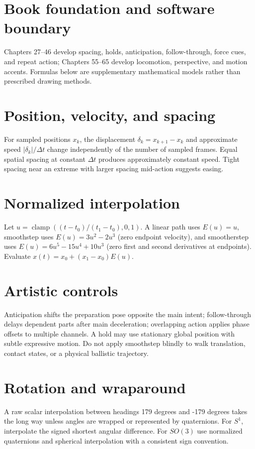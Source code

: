 \documentclass[10pt,letterpaper]{article}
\begin{document}
\makedoctitle
\makedocsummary
\tableofcontents\clearpage

\section{Book foundation and software boundary}
Chapters 27--46 develop spacing, holds, anticipation, follow-through, force cues, and repeat action; Chapters 55--65 develop locomotion, perspective, and motion accents. Formulas below are supplementary mathematical models rather than prescribed drawing methods.
\section{Position, velocity, and spacing}
For sampled positions $x_k$, the displacement $\delta_k=x_{k+1}-x_k$ and approximate speed $|\delta_k|/\Delta t$ change independently of the number of sampled frames. Equal spatial spacing at constant $\Delta t$ produces approximately constant speed. Tight spacing near an extreme with larger spacing mid-action suggests easing.
\section{Normalized interpolation}
Let $u=\operatorname{clamp}((t-t_0)/(t_1-t_0),0,1)$. A linear path uses $E(u)=u$, smoothstep uses $E(u)=3u^2-2u^3$ (zero endpoint velocity), and smootherstep uses $E(u)=6u^5-15u^4+10u^3$ (zero first and second derivatives at endpoints). Evaluate $x(t)=x_0+(x_1-x_0)E(u)$.
\section{Artistic controls}
Anticipation shifts the preparation pose opposite the main intent; follow-through delays dependent parts after main deceleration; overlapping action applies phase offsets to multiple channels. A hold may use stationary global position with subtle expressive motion. Do not apply smoothstep blindly to walk translation, contact states, or a physical ballistic trajectory.
\section{Rotation and wraparound}
A raw scalar interpolation between headings 179 degrees and -179 degrees takes the long way unless angles are wrapped or represented by quaternions. For $S^1$, interpolate the signed shortest angular difference. For $SO(3)$ use normalized quaternions and spherical interpolation with a consistent sign convention.
\end{document}
